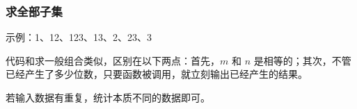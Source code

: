 \subsubsection{求全部子集}
	示例：1、12、123、13、2、23、3
	
	代码和求一般组合类似，区别在以下两点：首先，$m$ 和 $n$ 是相等的；其次，不管已经产生了多少位数，只要函数被调用，就立刻输出已经产生的结果。
	
	若输入数据有重复，统计本质不同的数据即可。
	
	